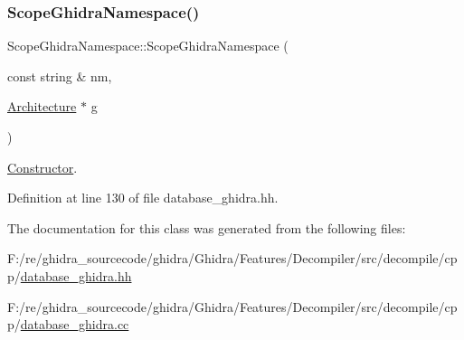 \subsubsection{\texorpdfstring{ScopeGhidraNamespace()}{ScopeGhidraNamespace()}}
{\footnotesize\ttfamily Scope\+Ghidra\+Namespace\+::\+Scope\+Ghidra\+Namespace (\begin{DoxyParamCaption}\item[{const string \&}]{nm,  }\item[{\mbox{\hyperlink{class_architecture}{Architecture}} $\ast$}]{g }\end{DoxyParamCaption})\hspace{0.3cm}{\ttfamily [inline]}}



\mbox{\hyperlink{class_constructor}{Constructor}}. 



Definition at line 130 of file database\+\_\+ghidra.\+hh.



The documentation for this class was generated from the following files\+:\begin{DoxyCompactItemize}
\item 
F\+:/re/ghidra\+\_\+sourcecode/ghidra/\+Ghidra/\+Features/\+Decompiler/src/decompile/cpp/\mbox{\hyperlink{database__ghidra_8hh}{database\+\_\+ghidra.\+hh}}\item 
F\+:/re/ghidra\+\_\+sourcecode/ghidra/\+Ghidra/\+Features/\+Decompiler/src/decompile/cpp/\mbox{\hyperlink{database__ghidra_8cc}{database\+\_\+ghidra.\+cc}}\end{DoxyCompactItemize}
